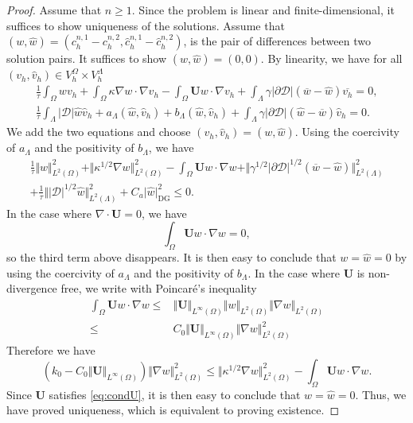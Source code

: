 \documentclass[pdflatex,sn-mathphys-num]{sn-jnl}%
\newcommand{\bfU}{{\boldsymbol U}}
\newcommand{\DG}{\mathrm{DG}}
\theoremstyle{thmstyleone}%
\theoremstyle{thmstyletwo}%
\theoremstyle{thmstylethree}%
\begin{document}
%
\begin{proof}
Assume that $n\geq 1$.
Since the problem is linear and finite-dimensional, it suffices to show uniqueness of the solutions.  Assume that $(w,\hat w) = (c_h^{n,1}-c_h^{n,2}, \hat c_h^{n,1}-\hat c_h^{n,2})$, is the pair of differences between two solution pairs. It suffices to show $(w,\hat w) = (0,0)$. By linearity, we have for all $(v_h,\hat v_h)\in V_h^\Omega\times V_h^\Lambda$
    \begin{align*}
    \frac{1}{\tau}\int_\Omega w v_h
      +   \int_\Omega  \kappa \nabla w \cdot \nabla v_h  
      - \int_\Omega \bfU w \cdot \nabla v_h
      +\int_\Lambda\gamma \vert \partial\mathcal{D}\vert \left(\overline{w}-\hat{w}\right)\overline{v_h}
        = 0,\\
      \frac{1}{\tau} \int_\Lambda |\mathcal{D}|\hat w \hat v_h 
    + a_\Lambda(\hat w, \hat v_h)
    + b_\Lambda(\hat w, \hat v_h)
    +\int_\Lambda \gamma|\partial\mathcal{D}|\left(\hat w-\overline{w}\right)   \hat v_h
   =    0.
\end{align*}
We add the two equations and choose $(v_h,\hat v_h) = (w, \hat w)$. Using the coercivity of $a_\Lambda$ and the positivity of $b_\Lambda$, we have
\begin{align*}
    \frac{1}{\tau}\Vert w \Vert_{L^2(\Omega)}^2
    + \Vert \kappa^{1/2} \nabla w \Vert_{L^2(\Omega)}^2  
      - \int_\Omega \bfU w \cdot \nabla w
      +\Vert \gamma^{1/2} \vert \partial\mathcal{D} 
      \vert^{1/2}  (\overline{w}-\hat{w})\Vert_{L^2(\Lambda)}^2
    \\
      +\frac{1}{\tau} \Vert  |\mathcal{D}|^{1/2} \hat w \Vert_{L^2(\Lambda)}^2 
    + C_a \vert \hat w \vert_{\DG}^2
    \leq 0.
\end{align*}
In the case where $\nabla \cdot \bfU = 0$, we have
\[
\int_\Omega \bfU w \cdot \nabla w = 0,
\]
so the third term above disappears.  It is then easy to conclude that $w=\hat w = 0$ by using the coercivity of $a_\Lambda$ and the positivity of $b_\Lambda$.
%
In the case where $\bfU$ is non-divergence free, we 
write with Poincar\'e's inequality
\begin{align*}
\int_\Omega \bfU w \cdot \nabla w \leq & \Vert \bfU \Vert_{L^\infty(\Omega)} \Vert w \Vert_{L^2(\Omega)} \Vert \nabla w \Vert_{L^2(\Omega)}\\
\leq & C_0 \Vert \bfU \Vert_{L^\infty(\Omega)} \Vert \nabla w \Vert_{L^2(\Omega)}^2
\end{align*}
Therefore we have 
\[
(k_0 - C_0 \Vert \bfU \Vert_{L^\infty(\Omega)}) \Vert \nabla w \Vert_{L^2(\Omega)}^2 \leq 
\Vert \kappa^{1/2} \nabla w \Vert_{L^2(\Omega)}^2
- \int_\Omega \bfU w \cdot \nabla w.
\]
Since $\bfU$ satisfies \eqref{eq:condU},
it is then easy to conclude that $w = \hat w  = 0$. Thus, we have proved uniqueness, which is equivalent to proving existence.


\end{proof}
\end{document}

